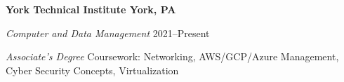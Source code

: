 \textbf{York Technical Institute \hfill York, PA} \par
\textit{Computer and Data Management} \hfill 2021--Present\par
\textit{Associate's Degree}
Coursework: Networking, AWS/GCP/Azure Management, Cyber Security Concepts, Virtualization \par
